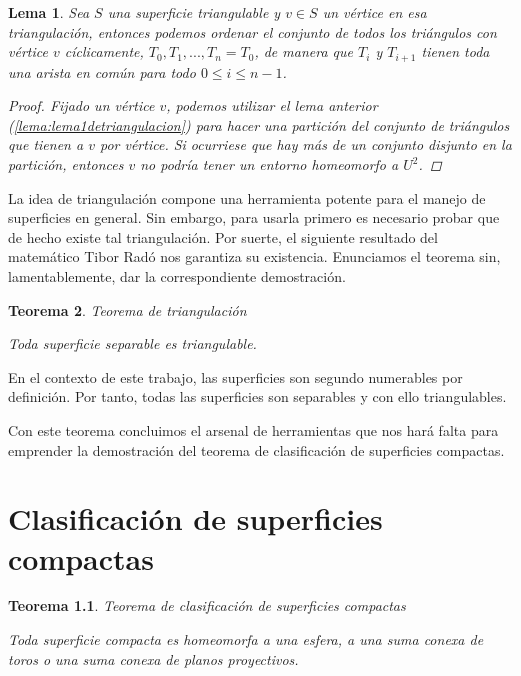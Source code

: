 \documentclass[a4paper,11pt,spanish, twoside, leqno]{tfg-uam}
\newtheorem{teor}{Teorema}[chapter]
\newtheorem{lema}[teor]{Lema}
\theoremstyle{definition}
\begin{document}
\begin{lema}\label{lema:lema2detriangulacion}
Sea  $S$ una superficie triangulable y $v\in S$ un vértice en esa triangulación, entonces podemos ordenar el conjunto de todos los triángulos con vértice $v$ cíclicamente,  $T_0, T_1, ..., T_n = T_0$, de manera que $T_i$ y $T_{i+1}$ tienen toda una arista en común para todo $0\leq i\leq n-1$.

\begin{proof}
Fijado un vértice $v$, podemos utilizar el lema anterior (\ref{lema:lema1detriangulacion}) para hacer una partición del conjunto de triángulos que tienen a $v$ por vértice. Si ocurriese que hay más de un conjunto disjunto en la partición, entonces $v$ no podría tener un entorno homeomorfo a $U^2$.
\end{proof}

\end{lema}

La idea de triangulación compone una herramienta potente para el manejo de superficies en general. Sin embargo, para usarla primero es necesario probar que de hecho existe  tal triangulación. Por suerte, el siguiente resultado del matemático Tibor Radó nos garantiza su existencia. Enunciamos el teorema sin, lamentablemente, dar la correspondiente demostración.

\begin{teor}{Teorema de triangulación}\label{teor:teoremaDeTriangulacion}	

Toda superficie separable es triangulable.
\end{teor}
En el contexto de este trabajo, las superficies son segundo numerables por definición. Por tanto, todas las superficies son separables y con ello triangulables.

Con este teorema concluimos el arsenal de herramientas que nos hará falta para emprender la demostración del teorema de clasificación de superficies compactas.





\chapter{Clasificación de superficies compactas}

\begin{teor}{Teorema de clasificación de superficies compactas}\label{teor:teoremadeclasificacion}	

Toda superficie compacta es homeomorfa a una esfera, a una suma conexa de toros o una suma conexa de planos proyectivos.
\end{teor}
\end{document}
